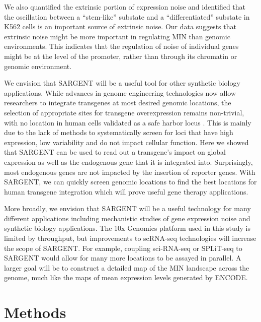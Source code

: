 We also quantified the extrinsic portion of expression noise and identified that the oscillation between a \enquote{stem-like} substate and a \enquote{differentiated} substate in K562 cells is an important source of extrinsic noise. Our data suggests that extrinsic noise might be more important in regulating MIN than genomic environments. This indicates that the regulation of noise of individual genes might be at the level of the promoter, rather than through its chromatin or genomic environment.
 
We envision that SARGENT will be a useful tool for other synthetic biology applications. While advances in genome engineering technologies now allow researchers to integrate transgenes at most desired genomic locations, the selection of appropriate sites for transgene overexpression remains non-trivial, with no location in human cells validated as a safe harbor locus \cite{papapetrouep_schambacha:GeneInsertion2016,pavanig_amendolam:TargetedGene2021}. This is mainly due to the lack of methods to systematically screen for loci that have high expression, low variability and do not impact cellular function. Here we showed that SARGENT can be used to read out a transgene’s impact on global expression as well as the endogenous gene that it is integrated into. Surprisingly, most endogenous genes are not impacted by the insertion of reporter genes. With SARGENT, we can quickly screen genomic locations to find the best locations for human transgene integration which will prove useful gene therapy applications.

More broadly, we envision that SARGENT will be a useful technology for many different applications including mechanistic studies of gene expression noise and synthetic biology applications. The 10x Genomics platform used in this study is limited by throughput, but improvements to scRNA-seq technologies will increase the scope of SARGENT. For example, coupling sci-RNA-seq \cite{caoj_shendurej:ComprehensiveSinglecell2017} or SPLiT-seq \cite{rosenbergab_seeligg:SinglecellProfiling2018} to SARGENT would allow for many more locations to be assayed in parallel. A larger goal will be to construct a detailed map of the MIN landscape across the genome, much like the maps of mean expression levels generated by ENCODE. 

\section{Methods}
\label{section:cas_methods}

